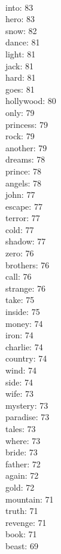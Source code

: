\begin{multicols}{6}
  \\ into: 83
  \\ hero: 83
  \\ snow: 82
  \\ dance: 81
  \\ light: 81
  \\ jack: 81
  \\ hard: 81
  \\ goes: 81
  \\ hollywood: 80
  \\ only: 79
  \\ princess: 79
  \\ rock: 79
  \\ another: 79
  \\ dreams: 78
  \\ prince: 78
  \\ angels: 78
  \\ john: 77
  \\ escape: 77
  \\ terror: 77
  \\ cold: 77
  \\ shadow: 77
  \\ zero: 76
  \\ brothers: 76
  \\ call: 76
  \\ strange: 76
  \\ take: 75
  \\ inside: 75
  \\ money: 74
  \\ iron: 74
  \\ charlie: 74
  \\ country: 74
  \\ wind: 74
  \\ side: 74
  \\ wife: 73
  \\ mystery: 73
  \\ paradise: 73
  \\ tales: 73
  \\ where: 73
  \\ bride: 73
  \\ father: 72
  \\ again: 72
  \\ gold: 72
  \\ mountain: 71
  \\ truth: 71
  \\ revenge: 71
  \\ book: 71
  \\ beast: 69

\end{multicols}
